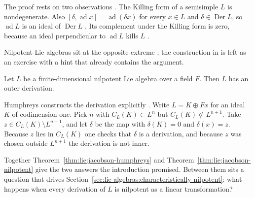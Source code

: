 The proof rests on two observations \cite[p.~23]{Humphreys1972}.  The
Killing form of a semisimple $L$ is nondegenerate.  Also
$[\delta,\operatorname{ad} x]=\operatorname{ad}(\delta x)$ for every
$x\in L$ and $\delta\in\operatorname{Der} L$, so $\operatorname{ad} L$ is
an ideal of $\operatorname{Der} L$ \cite[p.~23]{Humphreys1972}.  Its
complement under the Killing form is zero, because an ideal perpendicular
to $\operatorname{ad} L$ kills $L$
\cite[p.~23]{Humphreys1972}.

Nilpotent Lie algebras sit at the opposite extreme
\cite[Exercise~10, p.~14]{Humphreys1972}; the construction in
\cite[p.~14]{Humphreys1972} is left as an exercise with a hint that
already contains the argument.

\begin{theorem}\label{thm:lie:jacobson-nilpotent}
Let $L$ be a finite-dimensional nilpotent Lie algebra over a field $F$.
Then $L$ has an outer derivation.
\end{theorem}

Humphreys constructs the derivation explicitly
\cite[p.~14]{Humphreys1972}.  Write $L=K\oplus Fx$ for an ideal $K$ of
codimension one.  Pick $n$ with $C_L(K)\subset L^n$ but
$C_L(K)\not\subset L^{n+1}$.  Take $z\in C_L(K)\setminus L^{n+1}$, and
let $\delta$ be the map with $\delta(K)=0$ and $\delta(x)=z$.  Because $z$
lies in $C_L(K)$ one checks that $\delta$ is a derivation, and because $z$
was chosen outside $L^{n+1}$ the derivation is not inner.

Together Theorem~\ref{thm:lie:jacobson-humphreys} and
Theorem~\ref{thm:lie:jacobson-nilpotent} give the two answers the
introduction promised.  Between them sits a question that drives
Section~\ref{sec:lie-algebras:characteristically-nilpotent}: what happens
when every derivation of $L$ is nilpotent as a linear transformation?
